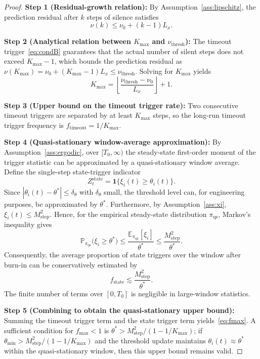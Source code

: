 \documentclass[10pt]{article}
\newcommand{\numax}{\nu(K_{\max})}
\newcommand{\fmax}{f_{\max}}
\newcommand{\Mstep}{M_{\text{step}}}
\begin{document}
\begin{proof}
\textbf{Step 1 (Residual-growth relation):} By Assumption~\ref{ass:lipschitz}, the prediction residual after $k$ steps of silence satisfies
\begin{equation}\label{eq:nu_k}
  \nu(k) \leq \nu_0 + (k-1)L_x.
\end{equation}

\textbf{Step 2 (Analytical relation between $K_{\max}$ and $\nu_{\mathrm{thresh}}$):} The timeout trigger~\eqref{eq:condB} guarantees that the actual number of silent steps does not exceed $K_{\max}-1$, which bounds the prediction residual as $\numax=\nu_0+(K_{\max}-1)L_x\leq\nu_{\mathrm{thresh}}$. Solving for $K_{\max}$ yields
\begin{equation}\label{eq:Kmax}
  K_{\max} = \left\lfloor\frac{\nu_{\mathrm{thresh}}-\nu_0}{L_x}\right\rfloor + 1.
\end{equation}

\textbf{Step 3 (Upper bound on the timeout trigger rate):} Two consecutive timeout triggers are separated by at least $K_{\max}$ steps, so the long-run timeout trigger frequency is $f_{\mathrm{timeout}}=1/K_{\max}$.

\textbf{Step 4 (Quasi-stationary window-average approximation):} By Assumption~\ref{ass:ergodic}, over $[T_0,\infty)$ the steady-state first-order moment of the trigger statistic can be approximated by a quasi-stationary window average. Define the single-step state-trigger indicator
\[
  Z_t^{\mathrm{state}}=\mathbf{1}\{\xi_i(t)\geq\theta_i(t)\}.
\]
Since $|\theta_i(t)-\theta^*|\leq\delta_\theta$ with $\delta_\theta$ small, the threshold level can, for engineering purposes, be approximated by $\theta^*$. Furthermore, by Assumption~\ref{ass:xi}, $\xi_i(t)\leq\Mstep^2$. Hence, for the empirical steady-state distribution $\pi_{\mathrm{qs}}$, Markov's inequality gives
\[
  \mathbb{P}_{\pi_{\mathrm{qs}}}\bigl(\xi_i\geq\theta^*\bigr)
  \leq \frac{\mathbb{E}_{\pi_{\mathrm{qs}}}[\xi_i]}{\theta^*}
  \leq \frac{\Mstep^2}{\theta^*}.
\]
Consequently, the average proportion of state triggers over the window after burn-in can be conservatively estimated by
\[
  f_{\mathrm{state}} \lesssim \frac{\Mstep^2}{\theta^*}.
\]
The finite number of terms over $[0,T_0]$ is negligible in large-window statistics.

\textbf{Step 5 (Combining to obtain the quasi-stationary upper bound):} Summing the timeout trigger term and the state trigger term yields~\eqref{eq:fmax}. A sufficient condition for $\fmax<1$ is $\theta^*>\Mstep^2/(1-1/K_{\max})$; if $\theta_{\min}>\Mstep^2/(1-1/K_{\max})$ and the threshold update maintains $\theta_i(t)\approx\theta^*$ within the quasi-stationary window, then this upper bound remains valid.
\end{proof}
\end{document}
